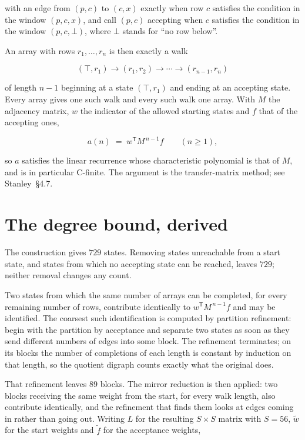\documentclass[11pt]{article}
\theoremstyle{definition}
\begin{document}
with an edge from $(p,c)$ to $(c,x)$ exactly when row $c$ satisfies the condition in the window $(p,c,x)$, and call $(p,c)$ accepting when $c$ satisfies the condition in the window $(p,c,\bot)$, where $\bot$ stands for ``no row below''.

An array with rows $r_1,\dots,r_n$ is then exactly a walk

\[(\top,r_1) \to (r_1,r_2) \to \cdots \to (r_{n-1},r_n)\]

of length $n-1$ beginning at a state $(\top,r_1)$ and ending at an accepting state. Every array gives one such walk and every such walk one array. With $M$ the adjacency matrix, $w$ the indicator of the allowed starting states and $f$ that of the accepting ones,

\[a(n) \;=\; w^{\mathsf T} M^{\,n-1} f \qquad (n \ge 1),\]

so $a$ satisfies the linear recurrence whose characteristic polynomial is that of $M$, and is in particular C-finite. The argument is the transfer-matrix method; see Stanley~\S4.7.

\section{The degree bound, derived}

The construction gives $729$ states. Removing states unreachable from a start state, and states from which no accepting state can be reached, leaves $729$; neither removal changes any count.

Two states from which the same number of arrays can be completed, for every remaining number of rows, contribute identically to $w^{\mathsf T}M^{\,n-1}f$ and may be identified. The coarsest such identification is computed by partition refinement: begin with the partition by acceptance and separate two states as soon as they send different numbers of edges into some block. The refinement terminates; on its blocks the number of completions of each length is constant by induction on that length, so the quotient digraph counts exactly what the original does.

That refinement leaves $89$ blocks. The mirror reduction is then applied: two blocks receiving the same weight from the start, for every walk length, also contribute identically, and the refinement that finds them looks at edges coming in rather than going out. Writing $L$ for the resulting $S \times S$ matrix with $S = 56$, $\tilde w$ for the start weights and $\tilde f$ for the acceptance weights,
\end{document}
